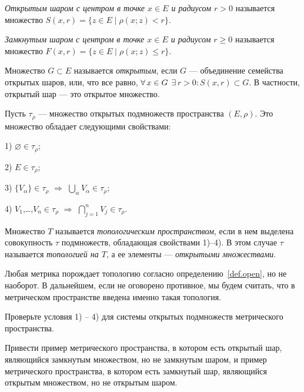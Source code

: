 \documentclass[10pt]{article}
\newcommand*{\p}[1]{#1\nobreak\discretionary{}{\hbox{$\mathsurround=0pt #1$}}{}}
\begin{document}
\begin{df}
\emph{Открытым шаром с центром в точке $x\in E$ и радиусом $r>0$}
называется множество $S(x,r)=\{z\in E\mid\rho(x;z)<r\}$.

\emph{Замкнутым шаром с центром в точке $x\in E$ и радиусом
$r\geqslant0$} называется множество $F(x,r)=\{z\in
E\mid\rho(x;z)\leqslant r\}$.
\end{df}

\begin{df}\label{def.open}
Множество $G\subset E$ называется \emph{открытым}, если $G$ ---
объединение семейства открытых шаров, или, что все равно, $\forall\,
x\p\in G$ $\exists\,r>0: S(x,r)\subset G$. В частности, открытый шар
--- это открытое множество.
\end{df}

Пусть $\tau_\rho$ --- множество открытых подмножеств пространства
$(E,\rho)$. Это множество обладает следующими свойствами:

1) $\varnothing\in \tau_\rho$;

2) $E\in\tau_\rho$;

3) $\{V_\alpha\}\in\tau_\rho$ $\Rightarrow$ $\bigcup\limits_\alpha
V_\alpha\in\tau_\rho$;

4) $V_1$,\ldots,$V_n\in\tau_\rho$ $\Rightarrow$
$\bigcap\limits_{j=1}^nV_j\in\tau_\rho$.

\begin{df}
Множество $T$ называется \emph{топологическим простра\-нством}, если
в нем выделена совокупность $\tau$ подмножеств, обладающая
свойствами 1)--4). В этом случае $\tau$ называется \emph{топологией
на $T$}, а ее элементы --- \emph{открытыми множествами}.
\end{df}

\begin{note}
Любая метрика порождает топологию согласно
определению~\ref{def.open}, но не наоборот. В дальнейшем, если не
оговорено противное, мы будем считать, что в метрическом
пространстве введена именно такая топология.
\end{note}

\begin{problem}
Проверьте условия 1) -- 4) для системы открытых подмножеств
метрического пространства.
\end{problem}

\begin{problem}
Привести пример метрического пространства, в котором есть открытый
шар, являющийся замкнутым множеством, но не замкнутым шаром, и
пример метрического пространства, в котором есть замкнутый шар,
являющийся открытым множеством, но не открытым шаром.
\end{problem}
\end{document}
